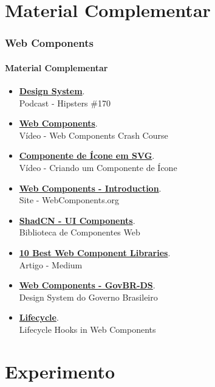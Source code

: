 \documentclass[
	9pt, %
	t, %
]{beamer}
\newcommand{\iconLink}[2]{\href{#1}{\faLink \hspace{0.2em} {#2}}}
\begin{document}
\section{Material Complementar}

\begin{frame}
	\frametitle{Web Components}
	\framesubtitle{Material Complementar}

	\begin{itemize}
		\item \iconLink{https://www.hipsters.tech/design-systems-hipsters-170/}{\textbf{Design System}}.\\Podcast - Hipsters \#170
		\item \iconLink{https://www.youtube.com/watch?v=PCWaFLy3VUo}{\textbf{Web Components}}.\\Vídeo - Web Components Crash Course
		\item \iconLink{https://youtu.be/7tsyjXxaloI?list=PL6BL1eKvLWOvfRhcDB0a5XJ2PD1_Rol6K}{\textbf{Componente de Ícone em SVG}}.\\Vídeo - Criando um Componente de Ícone
		\item \iconLink{https://www.webcomponents.org/introduction}{\textbf{Web Components - Introduction}}.\\Site - WebComponents.org
		\item \iconLink{https://ui.shadcn.com/}{\textbf{ShadCN - UI Components}}.\\Biblioteca de Componentes Web
		\item \iconLink{https://medium.com/@yourkube/10-best-web-component-libraries-b470541277e8}{\textbf{10 Best Web Component Libraries}}.\\Artigo - Medium
		\item \iconLink{https://webcomponent-ds.estaleiro.serpro.gov.br}{\textbf{Web Components - GovBR-DS}}.\\Design System do Governo Brasileiro
		\item \iconLink{https://ultimatecourses.com/blog/lifecycle-hooks-in-web-components}{\textbf{Lifecycle}}.\\Lifecycle Hooks in Web Components
	\end{itemize}

\end{frame}

\section{Experimento}
\end{document}
